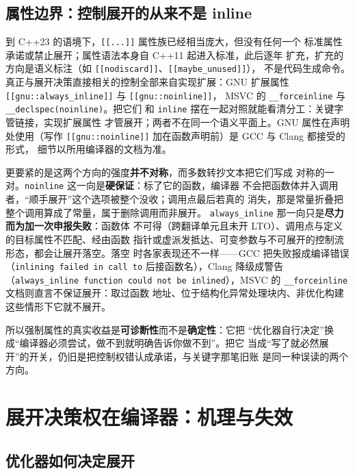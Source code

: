 \documentclass[12pt,a4paper,fontset=fandol]{ctexbook}
\newcommand{\cpp}[1]{C++#1}
\newcommand{\Tp}[1]{\texttt{#1}}
\newcommand{\Bk}{\discretionary{}{}{}}
\begin{document}
\subsection{属性边界：控制展开的从来不是 inline}
\label{sec:ch08-attr}

到 \cpp{23} 的语境下，\Tp{[[...]]} 属性族已经相当庞大，但没有任何一个
标准属性承诺或禁止展开；属性语法本身自 \cpp{11} 起进入标准，此后逐年
扩充，扩充的方向是语义标注（如 \Tp{[[nodiscard]]}、\Tp{[[maybe{\Bk}\_unused]]}），
不是代码生成命令。真正与展开决策直接相关的控制全部来自实现扩展：GNU
扩展属性 \Tp{[[gnu::always{\Bk}\_inline]]} 与 \Tp{[[gnu::noinline]]}，
MSVC 的 \Tp{\_\_forceinline} 与 \Tp{\_\_declspec(noinline)}。把它们
和 \Tp{inline} 摆在一起对照就能看清分工：关键字管链接，实现扩展属性
才管展开；两者不在同一个语义平面上。GNU 属性在声明处使用（写作
\Tp{[[gnu::noinline]]} 加在函数声明前）是 GCC 与 Clang 都接受的形式，
细节以所用编译器的文档为准。

更要紧的是这两个方向的强度\textbf{并不对称}，而多数转抄文本把它们写成
对称的一对。\Tp{noinline} 这一向是\textbf{硬保证}：标了它的函数，编译器
不会把函数体并入调用者，``顺手展开''这个选项被整个没收；调用点最后若真的
消失，那是常量折叠把整个调用算成了常量，属于删除调用而非展开。
\Tp{always\_inline} 那一向只是\textbf{尽力而为加一次申报失败}：函数体
不可得（跨翻译单元且未开 LTO）、调用点与定义的目标属性不匹配、经由函数
指针或虚派发抵达、可变参数与不可展开的控制流形态，都会让展开落空。落空
时各家表现还不一样——GCC 把失败报成编译错误（\Tp{inlining failed in call to}
后接函数名），Clang 降级成警告（\Tp{always{\Bk}\_inline function could not be
inlined}），MSVC 的 \Tp{\_\_forcein{\Bk}line} 文档则直言不保证展开：取过函数
地址、位于结构化异常处理块内、非优化构建这些情形下它就不展开。

所以强制属性的真实收益是\textbf{可诊断性}而不是\textbf{确定性}：它把
``优化器自行决定''换成``编译器必须尝试，做不到就明确告诉你做不到''。把它
当成``写了就必然展开''的开关，仍旧是把控制权错认成承诺，与关键字那笔旧账
是同一种误读的两个方向。

\section{展开决策权在编译器：机理与失效}
\label{sec:ch08-decision}

\subsection{优化器如何决定展开}
\label{sec:ch08-heuristics}
\end{document}
